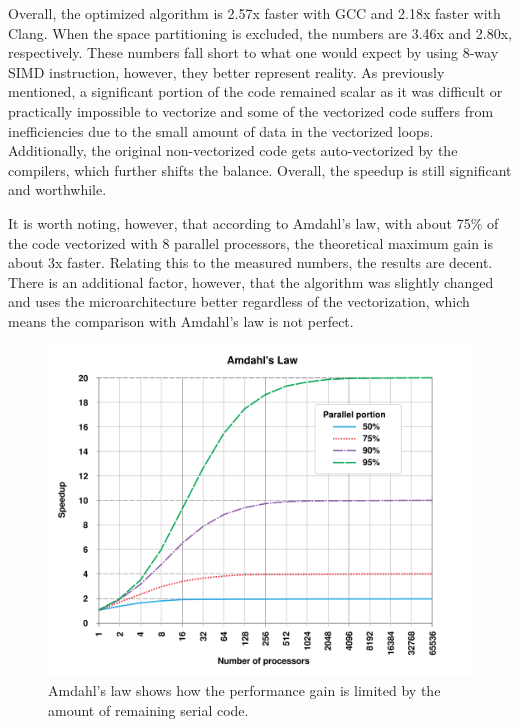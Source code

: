 \documentclass[12pt]{article}
\begin{document}
Overall, the optimized algorithm is 2.57x faster with GCC and 2.18x faster with Clang. When the space partitioning is excluded, the numbers are 3.46x and 2.80x, respectively. These numbers fall short to what one would expect by using 8-way SIMD instruction, however, they better represent reality. As previously mentioned, a significant portion of the code remained scalar as it was difficult or practically impossible to vectorize and some of the vectorized code suffers from inefficiencies due to the small amount of data in the vectorized loops. Additionally, the original non-vectorized code gets auto-vectorized by the compilers, which further shifts the balance. Overall, the speedup is still significant and worthwhile.

It is worth noting, however, that according to Amdahl's law, with about 75\% of the code vectorized with 8 parallel processors, the theoretical maximum gain is about 3x faster. Relating this to the measured numbers, the results are decent. There is an additional factor, however, that the algorithm was slightly changed and uses the microarchitecture better regardless of the vectorization, which means the comparison with Amdahl's law is not perfect.

\begin{figure}[H]
	\begin{center}
		\includegraphics[width=\textwidth]{amdahls_law}
	\end{center}
	\caption[Amdahl's law applied to vectorization]{Amdahl's law shows how the performance gain is limited by the amount of remaining serial code.}
	\label{fig_amdahls_law}
\end{figure}
\end{document}
